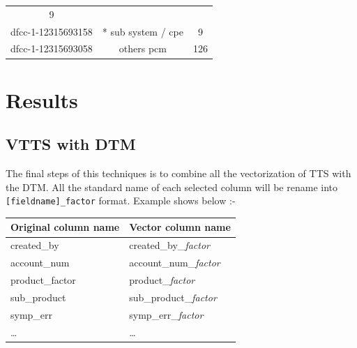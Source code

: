 \documentclass[]{article}
\begin{document}
\begin{longtable}[c]{@{}ccc@{}}
\begin{minipage}[t]{0.24\columnwidth}\centering\strut
9
\strut\end{minipage}\tabularnewline
\begin{minipage}[t]{0.24\columnwidth}\centering\strut
dfcc-1-12315693158
\strut\end{minipage} &
\begin{minipage}[t]{0.39\columnwidth}\centering\strut
* sub system / cpe
\strut\end{minipage} &
\begin{minipage}[t]{0.24\columnwidth}\centering\strut
9
\strut\end{minipage}\tabularnewline
\begin{minipage}[t]{0.24\columnwidth}\centering\strut
dfcc-1-12315693058
\strut\end{minipage} &
\begin{minipage}[t]{0.39\columnwidth}\centering\strut
others pcm
\strut\end{minipage} &
\begin{minipage}[t]{0.24\columnwidth}\centering\strut
126
\strut\end{minipage}\tabularnewline
\bottomrule
\end{longtable}

\section{Results}\label{results}

\subsection{VTTS with DTM}\label{vtts-with-dtm}

The final steps of this techniques is to combine all the vectorization
of TTS with the DTM. All the standard name of each selected column will
be rename into \texttt{{[}fieldname{]}\_factor} format. Example shows
below :-

\begin{longtable}[c]{@{}ll@{}}
\toprule
Original column name & Vector column name\tabularnewline
\midrule
\endhead
created\_by & created\_by\_\emph{factor}\tabularnewline
account\_num & account\_num\_\emph{factor}\tabularnewline
product\_factor & product\_\emph{factor}\tabularnewline
sub\_product & sub\_product\_\emph{factor}\tabularnewline
symp\_err & symp\_err\_\emph{factor}\tabularnewline
\ldots{} & \ldots{}\tabularnewline
\bottomrule
\end{longtable}
\end{document}
